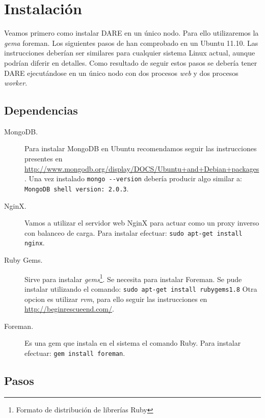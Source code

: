  \section{Instalación}
Veamos primero como instalar DARE en un único nodo. Para ello
utilizaremos la \emph{gema} foreman. Los siguientes pasos de han
comprobado en un Ubuntu 11.10. Las instrucciones deberían ser
similares para cualquier sistema Linux actual, aunque podrían diferir
en detalles. Como resultado de seguir estos pasos se debería tener
DARE ejecutándose en un único nodo con dos procesos \emph{web} y dos
procesos \emph{worker}.

\subsection{Dependencias}
\begin{description}
\item[MongoDB.] Para instalar MongoDB en Ubuntu recomendamos seguir
  las instrucciones presentes en
  \url{http://www.mongodb.org/display/DOCS/Ubuntu+and+Debian+packages}. Una
  vez instalado \verb+mongo --version+ debería producir algo similar
  a: \verb+MongoDB shell version: 2.0.3+.
\item[NginX.] Vamos a utilizar el servidor web NginX para actuar como
  un proxy inverso con balanceo de carga. Para instalar efectuar:
  \verb+sudo apt-get install nginx+.
\item[Ruby Gems.] Sirve para instalar
  \emph{gems}\cite{RUBY_GEMS}\footnote{Formato de distribución de
    librerías Ruby}. Se necesita para instalar Foreman.  Se pude
  instalar utilizando el comando:
  \verb+sudo apt-get install rubygems1.8+ Otra opcion es utilizar
  \emph{rvm}, para ello seguir las instrucciones en
  \url{http://beginrescueend.com/}.
\item[Foreman.] Es una gem que instala en el sistema el comando
  Ruby. Para instalar efectuar: \verb+gem install foreman+.
\end{description}

\subsection{Pasos}

